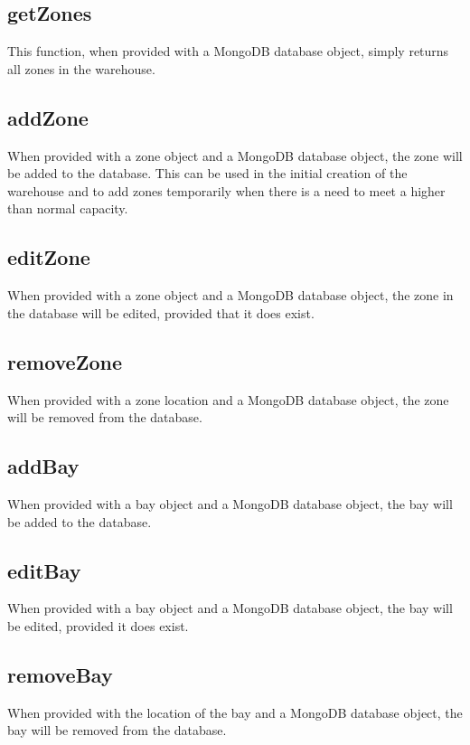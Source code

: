 \documentclass[letterpaper,10pt,english]{sphinxmanual}
\begin{document}
\subsection{getZones}
\label{\detokenize{docs/Introduction/Backend_overview:getzones}}
This function, when provided with a MongoDB database object, simply
returns all zones in the warehouse.


\subsection{addZone}
\label{\detokenize{docs/Introduction/Backend_overview:addzone}}
When provided with a zone object and a MongoDB database object, the zone
will be added to the database. This can be used in the initial creation
of the warehouse and to add zones temporarily when there is a need to
meet a higher than normal capacity.


\subsection{editZone}
\label{\detokenize{docs/Introduction/Backend_overview:editzone}}
When provided with a zone object and a MongoDB database object, the zone
in the database will be edited, provided that it does exist.


\subsection{removeZone}
\label{\detokenize{docs/Introduction/Backend_overview:removezone}}
When provided with a zone location and a MongoDB database object, the
zone will be removed from the database.


\subsection{addBay}
\label{\detokenize{docs/Introduction/Backend_overview:addbay}}
When provided with a bay object and a MongoDB database object, the bay
will be added to the database.


\subsection{editBay}
\label{\detokenize{docs/Introduction/Backend_overview:editbay}}
When provided with a bay object and a MongoDB database object, the bay
will be edited, provided it does exist.


\subsection{removeBay}
\label{\detokenize{docs/Introduction/Backend_overview:removebay}}
When provided with the location of the bay and a MongoDB database
object, the bay will be removed from the database.
\end{document}
